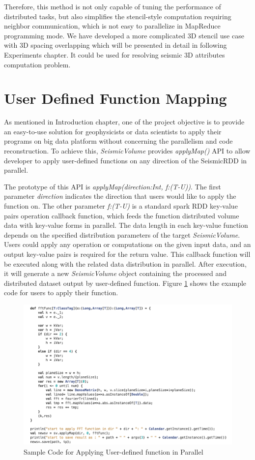 Therefore, this method is not only capable of tuning the performance of distributed tasks, but also simplifies the stencil-style computation requiring neighbor communication, which is not easy to parallelize in MapReduce programming mode. We have developed a more complicated 3D stencil use case with 3D spacing overlapping which will be presented in detail in following Experiments chapter. It could be used for resolving seismic 3D attributes computation problem.


\section{User Defined Function Mapping}

As mentioned in Introduction chapter, one of the project objective is to provide an easy-to-use solution for geophysicists or data scientists to apply their programs on big data platform without concerning the parallelism and code reconstruction. To achieve this, \emph{SeismicVolume} provides \emph{applyMap()} API to allow developer to apply user-defined functions on any direction of the SeismicRDD in parallel. 

The prototype of this API is \emph{applyMap(direction:Int, f:(T-U))}. The first parameter \emph{direction} indicates the direction that users would like to apply the function on. The other parameter \emph{f:(T-U)} is a standard spark RDD key-value pairs operation callback function, which feeds the function distributed volume data with key-value forms in parallel. The data length in each key-value function depends on the specified distribution parameters of the target \emph{SeismicVolume}.  Users could apply any operation or computations on the given input data, and an output key-value pairs is required for the return value. This callback function will be executed along with the related data distribution in parallel. After execution, it will generate a new \emph{SeismicVolume} object containing the processed and distributed dataset output by user-defined function.  Figure \ref{code_apply} shows the example code for users to apply their function.

\begin{figure}[h]
\centering
\includegraphics[scale=0.6]{figures/code_apply.png}
\caption{Sample Code for Applying User-defined function in Parallel}
\label{code_apply}
\end{figure}


